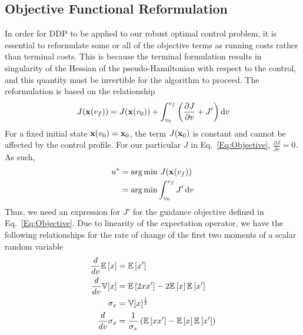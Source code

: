 \subsection{Objective Functional Reformulation}
In order for DDP to be applied to our robust optimal control problem, it is essential to reformulate some or all of the objective terms as running costs rather than terminal costs. This is because the terminal formulation results in singularity of the Hessian of the pseudo-Hamiltonian with respect to the control, and this quantity must be invertible for the algorithm to proceed. 
The reformulation is based on the relationship 
\begin{align}
J(\mathbf{x}(v_f)) = J(\mathbf{x}(v_0)) + \int_{v_0}^{v_f}\left(\frac{\partial J}{\partial v} + J'\right)\mathrm{d}v \label{Eq:GenericCostRate}
\end{align}
For a fixed initial state $\mathbf{x}(v_0)=\mathbf{x}_0$, the term $J(\mathbf{x}_0)$ is constant and cannot be affected by the control profile. For our particular $J$ in Eq.~\eqref{Eq:Objective}, $\frac{\partial J}{\partial v} = 0$. As such, 
\begin{align}
	u^* &= \arg\min \,J(\mathbf{x}(v_f)) \\
	&= \arg\min\int_{v_0}^{v_f}J'\,\mathrm{d}v
\end{align}
Thus, we need an expression for $J'$ for the guidance objective defined in Eq.~\eqref{Eq:Objective}. Due to linearity of the expectation operator, we have the following relationships for the rate of change of the first two moments of a scalar random variable
\begin{align}
	\frac{d }{d v}\mathbb{E}\left[x\right] &= \mathbb{E}\left[x'\right] \label{Eq:MeanRateVel}\\
	\frac{d }{d v}\mathbb{V}[x] &= \mathbb{E}\left[2xx'\right] - 2\mathbb{E}\left[x\right]\mathbb{E}\left[x'\right] \\
	\sigma_x &= \mathbb{V}[x]^{\frac{1}{2}} \\
	\frac{d }{d v}\sigma_x &= \frac{1}{\sigma_x}\left(\mathbb{E}\left[xx'\right] - \mathbb{E}\left[x\right]\mathbb{E}\left[x'\right]\right) \label{Eq:StdRateVel}
\end{align}
